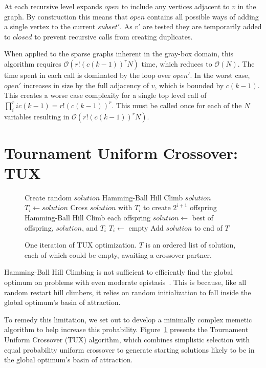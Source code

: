 \documentclass{sig-alternate}
\newcommand{\BigO}[1]{$\mathcal{O}{(#1)}$}
\begin{document}
At each recursive level  expands $open$ to include any vertices
adjacent to $v$ in the graph. By construction this means that $open$ contains
all possible ways of adding a single vertex to the current $subset'$. As $v'$
are tested they are temporarily added to $closed$ to prevent recursive calls
from creating duplicates.

When applied to the sparse graphs inherent in the gray-box domain, this algorithm
requires \BigO{r!(c(k-1))^rN} time, which reduces to \BigO{N}. The time spent
in each call is dominated by the loop over $open'$. In the worst case, $open'$
increases in size by the full adjacency of $v$, which is bounded by $c(k-1)$.
This creates a worse case complexity for a single top level call of
$\prod_{i}^{r} ic(k-1) = r!(c(k-1))^r$. This must be called once for each
of the $N$ variables resulting in \BigO{r!(c(k-1))^rN}.

\section{Tournament Uniform Crossover: TUX}
\label{sec-tux}
\begin{figure}
  \begin{algorithmic}[1]
    \State Create random $solution$
    \State Hamming-Ball Hill Climb $solution$
        \State $T_i \leftarrow solution$
        \State \Return
      \EndIf
      \State Cross $solution$ with $T_i$ to create $2^{i+1}$ offspring
      \State Hamming-Ball Hill Climb each offspring
      \State $solution \leftarrow$ best of offspring, $solution$, and $T_i$
      \State $T_i \leftarrow$ empty
    \EndFor
    \State Add $solution$ to end of $T$
  \EndProcedure
\end{algorithmic}
  \caption{One iteration of TUX optimization. $T$ is an
           ordered list of solution, each of which could be empty,
           awaiting a crossover partner.}
  \label{fig-TUX}
\end{figure}

Hamming-Ball Hill Climbing is not sufficient to efficiently find the global optimum
on problems with even moderate epistasis~\cite{chicano:2014:ball}. This is because,
like all random restart hill climbers, it relies on random initialization to fall
inside the global optimum's basin of attraction.

To remedy this limitation, we set out to develop a minimally complex memetic
algorithm to help increase this probability. Figure~\ref{fig-TUX} presents
the Tournament Uniform Crossover (TUX) algorithm, which combines simplistic
selection with equal probability uniform crossover to generate starting
solutions likely to be in the global optimum's basin of attraction.
\end{document}
